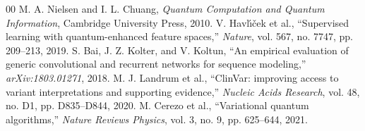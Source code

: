 \documentclass[conference]{IEEEtran}
\begin{document}
\begin{thebibliography}{00}
 M. A. Nielsen and I. L. Chuang, \textit{Quantum Computation and Quantum Information}, Cambridge University Press, 2010.
 V. Havl{\'\i}{\v{c}}ek et al., ``Supervised learning with quantum-enhanced feature spaces,'' \textit{Nature}, vol. 567, no. 7747, pp. 209--213, 2019.
 S. Bai, J. Z. Kolter, and V. Koltun, ``An empirical evaluation of generic convolutional and recurrent networks for sequence modeling,'' \textit{arXiv:1803.01271}, 2018.
 M. J. Landrum et al., ``ClinVar: improving access to variant interpretations and supporting evidence,'' \textit{Nucleic Acids Research}, vol. 48, no. D1, pp. D835--D844, 2020.
 M. Cerezo et al., ``Variational quantum algorithms,'' \textit{Nature Reviews Physics}, vol. 3, no. 9, pp. 625--644, 2021.
\end{thebibliography}
\end{document}
